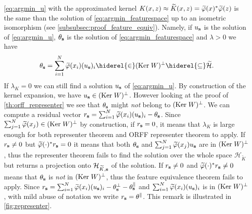 \documentclass[twoside,11pt]{article}
\begin{document}
\cref{eq:argmin_u} with the approximated kernel $K(x,z) \approx
\tildeK{\omega}(x,z) = \tildePhi{\omega}(x)^\adjoint\tildePhi{\omega}(z)$ is
the same than the solution of \cref{eq:argmin_featurespace} up to an isometric
isomorphism (see \cref{subsubsec:proof_feature_equiv}). Namely, if
$u_{\boldsymbol{\mathbf{s}}}$ is the solution of \cref{eq:argmin_u}, $\theta_{\boldsymbol{\mathbf{s}}}$ is the
solution of \cref{eq:argmin_featurespace} and $\lambda>0$ we have
\begin{dmath*}
    \theta_{\seq{s}} = \sum_{i=1}^{N} \tildePhi{\omega}(x_i) (u_{\seq{s}})_i
    \hiderel{\in} (\Ker W)^{\perp} \hiderel{\subseteq} \tildeH{\omega}.
\end{dmath*}
If $\lambda_K=0$ we can still find a solution $u_{\boldsymbol{\mathbf{s}}}$ of
\cref{eq:argmin_u}. By construction of the kernel expansion, we have
$u_{\boldsymbol{\mathbf{s}}}\in(\text{Ker}\; W)^\bot$. However looking at the proof of
\cref{th:orff_representer} we see that $\theta_{\boldsymbol{\mathbf{s}}}$ might \emph{not}
belong to $(\text{Ker}\; W)^\bot$. We can compute a residual vector $r_{\seq{s}} =
\sum_{i=1}^{N} \tildePhi{\omega}(x_i) (u_{\seq{s}})_i - \theta_{\seq{s}}$.
Since $\sum_{j=1}^N \tildePhi{\omega}(x_j)\in(\Ker W)^\bot$ by construction, if
$r_{\boldsymbol{\mathbf{s}}}=0$, it means that $\lambda_K$ is large enough for both representer
theorem and \acs{ORFF} representer theorem to apply. If $r_{\boldsymbol{\mathbf{s}}}\neq 0$ but
$\tildePhi{\omega}(\cdot)^\adjoint r_{\seq{s}} = 0$ it means that both
$\theta_{\boldsymbol{\mathbf{s}}}$ and $\sum_{j=1}^{N} \tildePhi{\omega}(x_j) u_{\seq{s}}$ are
in $(\text{Ker}\; W)^\bot$, thus the representer theorem fails to find the 
solution over the whole space $\mathcal{H}_{\widetilde{K}}$ but returns a
projection onto $\mathcal{H}_{\widetilde{K},\boldsymbol{\mathbf{s}}}$ of the solution. If
$r_{\boldsymbol{\mathbf{s}}} \neq 0$ and $\tildePhi{\omega}(\cdot)^\adjoint r_{\seq{s}} \neq 0$
means that $\theta_{\boldsymbol{\mathbf{s}}}$ is \emph{not} in $(\text{Ker}\; W)^\bot$, thus the
feature equivalence theorem fails to apply. Since $r_{\seq{s}} = \sum_{i=1}^N
\tildePhi{\omega}(x_i)(u_{\seq{s}})_i - \theta_{\seq{s}}^\perp -
\theta_{\seq{s}}^\parallel$ and $\sum_{i=1}^N
\tildePhi{\omega}(x_i)(u_{\seq{s}})_i$ is in $(\text{Ker}\; W)^\perp$, with mild abuse
of notation we write $r_{\boldsymbol{\mathbf{s}}}=\theta^\parallel$. This remark is illustrated
in \cref{fig:representer}.
\end{document}
